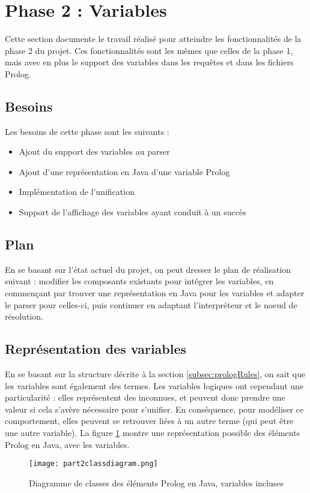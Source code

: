 \documentclass[../report.tex]{subfiles}
\begin{document}
\section{Phase 2 : Variables}
Cette section documente le travail réalisé pour atteindre les fonctionnalités de la phase 2 du projet. Ces fonctionnalités sont les mêmes que celles de la phase 1, mais avec en plus le support des variables dans les requêtes et dans les fichiers Prolog.
\subsection{Besoins}
Les besoins de cette phase sont les suivants :
\begin{itemize}
    \item Ajout du support des variables au parser
    \item Ajout d'une représentation en Java d'une variable Prolog
    \item Implémentation de l'unification
    \item Support de l'affichage des variables ayant conduit à un succès
\end{itemize}
\subsection{Plan}
En se basant sur l'état actuel du projet, on peut dresser le plan de réalisation suivant : modifier les composants existants pour intégrer les variables, en commençant par trouver une représentation en Java pour les variables et adapter le parser pour celles-ci, puis continuer en adaptant l'interpréteur et le noeud de résolution.
\subsection{Représentation des variables}
En se basant sur la structure décrite à la section \ref{subsec:prologRules}, on sait que les variables sont également des termes. Les variables logiques ont cependant une particularité : elles représentent des inconnues, et peuvent donc prendre une valeur si cela s'avère nécessaire pour s'unifier. En conséquence, pour modéliser ce comportement, elles peuvent se retrouver liées à un autre terme (qui peut être une autre variable). La figure \ref{fig:part2classdiagram} montre une représentation possible des éléments Prolog en Java, avec les variables.
\begin{figure}[h]
    \centering
    \texttt{[image: part2classdiagram.png]}
    \caption{Diagramme de classes des éléments Prolog en Java, variables incluses}
    \label{fig:part2classdiagram}
\end{figure}
\end{document}
